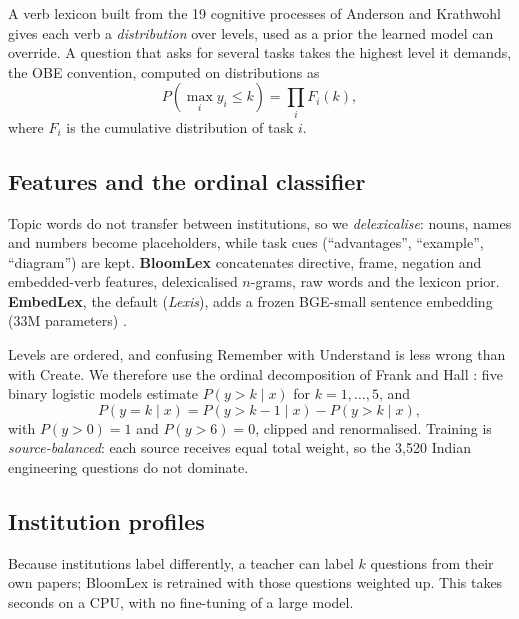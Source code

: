\documentclass[conference]{IEEEtran}
\begin{document}
A verb lexicon built from the 19 cognitive processes of Anderson and Krathwohl \cite{anderson2001}
gives each verb a \emph{distribution} over levels, used as a prior the learned model can
override. A question that asks for several tasks takes the highest level it demands, the OBE
convention, computed on distributions as
\begin{equation}
P(\max_i y_i \le k) = \textstyle\prod_i F_i(k),
\end{equation}
where $F_i$ is the cumulative distribution of task $i$.

\subsection{Features and the ordinal classifier}
Topic words do not transfer between institutions, so we \emph{delexicalise}: nouns, names and
numbers become placeholders, while task cues (``advantages'', ``example'', ``diagram'') are kept.
\textbf{BloomLex} concatenates directive, frame, negation and embedded-verb features,
delexicalised $n$-grams, raw words and the lexicon prior. \textbf{EmbedLex}, the default
(\emph{Lexis}), adds a frozen BGE-small sentence embedding (33M parameters) \cite{bge}.

Levels are ordered, and confusing Remember with Understand is less wrong than with Create. We
therefore use the ordinal decomposition of Frank and Hall \cite{frankhall2001}: five binary
logistic models estimate $P(y>k\mid x)$ for $k=1,\dots,5$, and
\begin{equation}
P(y=k\mid x) = P(y>k-1\mid x) - P(y>k\mid x),
\end{equation}
with $P(y>0)=1$ and $P(y>6)=0$, clipped and renormalised. Training is \emph{source-balanced}:
each source receives equal total weight, so the 3,520 Indian engineering questions do not
dominate.

\subsection{Institution profiles}
Because institutions label differently, a teacher can label $k$ questions from their own papers;
BloomLex is retrained with those questions weighted up. This takes seconds on a CPU, with no
fine-tuning of a large model.
\end{document}
